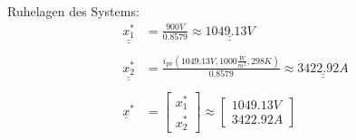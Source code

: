 \newline
Ruhelagen des Systems:
\begin{align}
    \underline{\underline{x_{\mathrm{1}}^*}} &= \frac{900V}{0.8579} \approx \underline{\underline{1049.13V}} \nonumber \\ \nonumber \\
    \underline{\underline{x_{\mathrm{2}}^*}} &= \frac{i_{\mathrm{pv}}(1049.13V, 1000\frac{W}{m^2}, 298K)}{0.8579} \approx\underline{\underline{3422.92A}} \nonumber \\ \nonumber \\
    \underline{x}^* &= 
    \begin{bmatrix}
        x_{\mathrm{1}}^* \\
        x_{\mathrm{2}}^*
    \end{bmatrix} \approx
    \begin{bmatrix}
        1049.13V \\
        3422.92A
    \end{bmatrix}
    \label{eq:Gleichung12}
\end{align}

